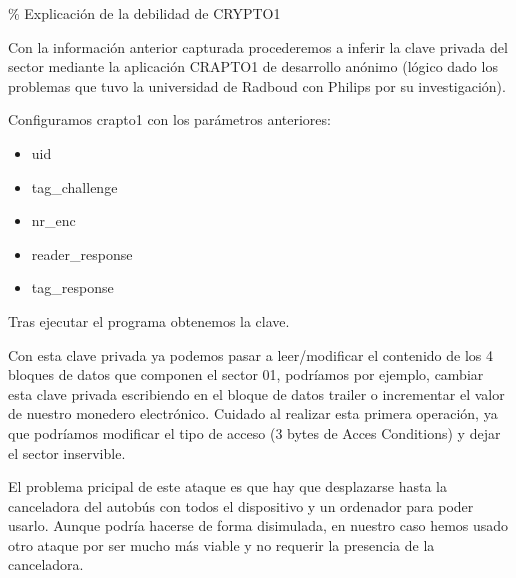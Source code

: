 \% Explicación de la debilidad de CRYPTO1

Con la información anterior capturada procederemos a inferir la clave
privada del sector mediante la aplicación CRAPTO1 de desarrollo anónimo
(lógico dado los problemas que tuvo la universidad de Radboud con
Philips por su investigación).

Configuramos crapto1 con los parámetros anteriores:

\begin{itemize}
\itemsep1pt\parskip0pt
\item
  uid\\
\item
  tag\_challenge\\
\item
  nr\_enc\\
\item
  reader\_response
\item
  tag\_response
\end{itemize}

Tras ejecutar el programa obtenemos la clave.

Con esta clave privada ya podemos pasar a leer/modificar el contenido de
los 4 bloques de datos que componen el sector 01, podríamos por ejemplo,
cambiar esta clave privada escribiendo en el bloque de datos trailer o
incrementar el valor de nuestro monedero electrónico. Cuidado al
realizar esta primera operación, ya que podríamos modificar el tipo de
acceso (3 bytes de Acces Conditions) y dejar el sector inservible.

El problema pricipal de este ataque es que hay que desplazarse hasta la
canceladora del autobús con todos el dispositivo y un ordenador para
poder usarlo. Aunque podría hacerse de forma disimulada, en nuestro caso
hemos usado otro ataque por ser mucho más viable y no requerir la
presencia de la canceladora.
